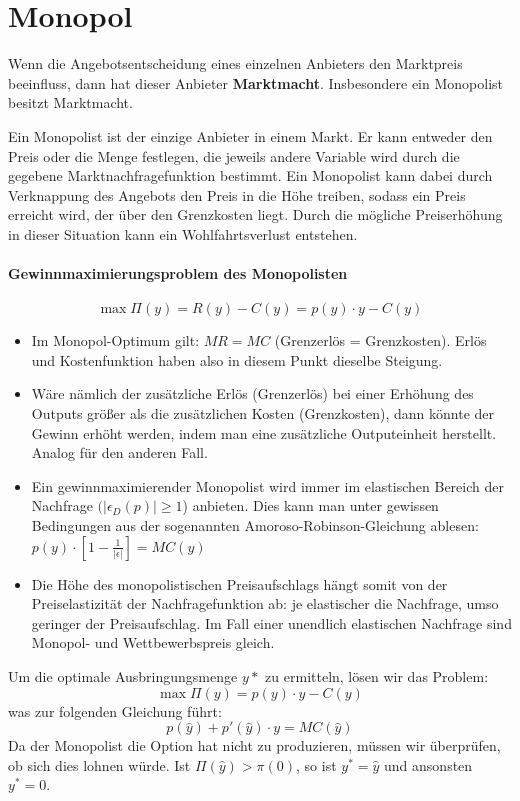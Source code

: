 \chapter{Monopol}

Wenn die Angebotsentscheidung eines einzelnen Anbieters den Marktpreis beeinfluss, dann hat dieser Anbieter \textbf{Marktmacht}. Insbesondere ein Monopolist besitzt Marktmacht. ~\bigskip

Ein Monopolist ist der einzige Anbieter in einem Markt. Er kann entweder den Preis oder die Menge festlegen, die jeweils andere Variable wird durch die gegebene Marktnachfragefunktion bestimmt. Ein Monopolist kann dabei durch Verknappung des Angebots den Preis in die Höhe treiben, sodass ein Preis erreicht wird, der über den Grenzkosten liegt. Durch die mögliche Preiserhöhung in dieser Situation kann ein Wohlfahrtsverlust entstehen.

\subsubsection*{Gewinnmaximierungsproblem des Monopolisten}
$$\max \Pi(y) = R(y) - C(y) = p(y) \cdot y - C(y)$$
\begin{itemize}
	\item Im Monopol-Optimum gilt: $MR = MC$ (Grenzerlös = Grenzkosten). Erlös und Kostenfunktion haben also in diesem Punkt dieselbe Steigung.
	\item Wäre nämlich der zusätzliche Erlös (Grenzerlös) bei einer Erhöhung des Outputs größer als die zusätzlichen Kosten (Grenzkosten), dann könnte der Gewinn erhöht werden, indem man eine zusätzliche Outputeinheit herstellt. Analog für den anderen Fall.
	\item Ein gewinnmaximierender Monopolist wird immer im elastischen Bereich der Nachfrage $(|\epsilon_D(p)| \geq 1$) anbieten. Dies kann man unter gewissen Bedingungen aus der sogenannten Amoroso-Robinson-Gleichung ablesen: $p(y) \cdot \left[ 1 - \frac{1}{|\epsilon|} \right] = MC(y)$
	\item Die Höhe des monopolistischen Preisaufschlags hängt somit von der Preiselastizität der Nachfragefunktion ab: je elastischer die Nachfrage, umso geringer der Preisaufschlag. Im Fall einer unendlich elastischen Nachfrage sind Monopol- und Wettbewerbspreis gleich. 
\end{itemize} 

\begin{kr}[Monopolist]
	Um die optimale Ausbringungsmenge $y*$ zu ermitteln, lösen wir das Problem:
	$$ \max \Pi(y) = p(y) \cdot y - C(y) $$
	was zur folgenden Gleichung führt:
		$$ p(\hat{y}) + p'(\hat{y}) \cdot y = MC(\hat{y}) $$	
	Da der Monopolist die Option hat nicht zu produzieren, müssen wir überprüfen, ob sich dies lohnen würde. Ist $\Pi(\hat{y}) > \pi(0)$, so ist $y^* = \hat{y}$ und ansonsten $y^* = 0$.
\end{kr}